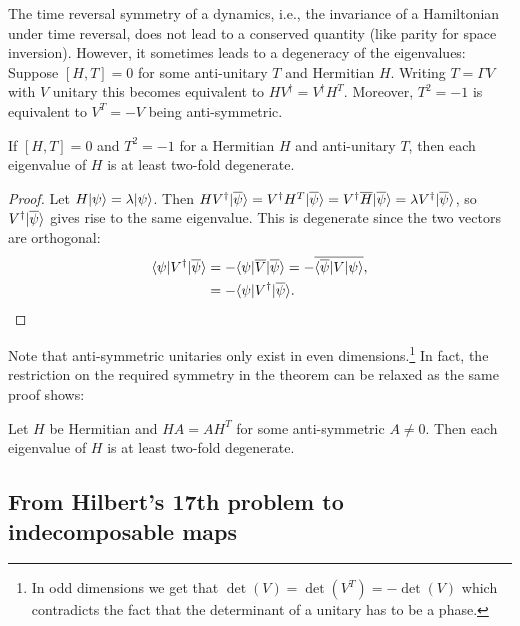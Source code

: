 \documentclass[11pt,a4paper]{article}
\numberwithin{equation}{section}
\begin{document}
The time reversal symmetry of a dynamics, i.e., the invariance of a Hamiltonian under time reversal, does not lead to a
conserved quantity (like parity for space inversion). However, it sometimes leads to a degeneracy of the eigenvalues:
Suppose $[H,T]=0$ for some anti-unitary $T$ and Hermitian $H$. Writing $T=\Gamma V$ with $V$ unitary this becomes
equivalent to $HV^\dagger = V^\dagger H^T$. Moreover, $T^2=-1$ is equivalent to $V^T=-V$ being anti-symmetric.

\begin{theorem}
    If $[H,T]=0$ and $T^2=-1$ for a Hermitian $H$ and anti-unitary $T$, then each eigenvalue of $H$ is at least two-fold
    degenerate.
\end{theorem}

\begin{proof}
    Let $H|\psi\rangle=\lambda|\psi\rangle$. Then $HV^\dagger|\overline{\psi}\rangle=V^\dagger H^T|\overline{\psi}\rangle
        =V^\dagger \overline{H}|\overline{\psi}\rangle=\lambda V^\dagger|\overline{\psi}\rangle$, so $V^\dagger|\overline{\psi}\rangle$
    gives rise to the same eigenvalue. This is degenerate since the two vectors are orthogonal:
    \begin{align}
        \langle\psi|V^\dagger|\overline{\psi}\rangle
         &= -\langle\psi|\overline{V}|\overline{\psi}\rangle
        = -\overline{\langle\overline{\psi}|V|\psi\rangle},
        \label{eq:ch3:3.29}
        \\
         &= -\langle\psi|V^\dagger|\overline{\psi}\rangle.
        \label{eq:ch3:3.30}
    \end{align}
\end{proof}

Note that anti-symmetric unitaries only exist in even dimensions.\footnote{In odd dimensions we get that
    $\det(V)=\det(V^T)=-\det(V)$ which contradicts the fact that the determinant of a unitary has to be a phase.} In fact,
the restriction on the required symmetry in the theorem can be relaxed as the same proof shows:

\begin{theorem}
    Let $H$ be Hermitian and $HA=AH^T$ for some anti-symmetric $A\neq 0$. Then each eigenvalue of $H$ is at least two-fold
    degenerate.
\end{theorem}

\subsection{From Hilbert's 17th problem to indecomposable maps}
\end{document}
